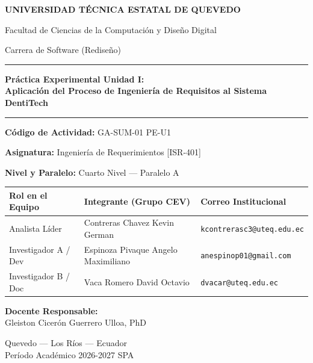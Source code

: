 \documentclass[11pt,a4paper]{article}
\begin{document}
\begin{titlepage}
    \centering
    {\Large\textbf{UNIVERSIDAD TÉCNICA ESTATAL DE QUEVEDO}}\par
    \vspace{0.2cm}
    {\large Facultad de Ciencias de la Computación y Diseño Digital}\par
    {\large Carrera de Software (Rediseño)}\par
    
    \vspace{1.2cm}
    \rule{\textwidth}{1.5pt}\par
    \vspace{0.4cm}
    {\LARGE\bfseries Práctica Experimental Unidad I:\\Aplicación del Proceso de Ingeniería de Requisitos al Sistema DentiTech\par}
    \vspace{0.4cm}
    \rule{\textwidth}{1.5pt}\par
    
    \vspace{0.8cm}
    {\large\textbf{Código de Actividad:} GA-SUM-01 \textperiodcentered{} PE-U1}\par
    {\large\textbf{Asignatura:} Ingeniería de Requerimientos [ISR-401]}\par
    {\large\textbf{Nivel y Paralelo:} Cuarto Nivel --- Paralelo A}\par
    
    \vspace{1.2cm}
    \begin{tabularx}{\textwidth}{|l|l|X|}
        \hline
        \rowcolor{gray!15}
        \textbf{Rol en el Equipo} & \textbf{Integrante (Grupo CEV)} & \textbf{Correo Institucional} \\ \hline
        Analista Líder & Contreras Chavez Kevin German & \texttt{kcontrerasc3@uteq.edu.ec} \\ \hline
        Investigador A / Dev & Espinoza Pivaque Angelo Maximiliano & \texttt{anespinop01@gmail.com} \\ \hline
        Investigador B / Doc & Vaca Romero David Octavio & \texttt{dvacar@uteq.edu.ec} \\ \hline
    \end{tabularx}
    
    \vfill
    {\large\textbf{Docente Responsable:}\\Gleiston Cicerón Guerrero Ulloa, PhD}\par
    \vspace{0.6cm}
    {\large Quevedo --- Los Ríos --- Ecuador\\Período Académico 2026-2027 SPA}
\end{titlepage}
\end{document}
